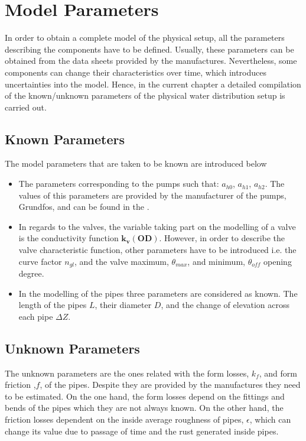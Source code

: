\section{Model Parameters}
\label{estimateParameters}
In order to obtain a complete model of the physical setup, all the parameters describing the components have to be defined. Usually, these parameters can be 
obtained from the data sheets provided by the manufactures. Nevertheless, some components can change their characteristics over time, which introduces uncertainties 
into the model. Hence, in the current chapter a detailed compilation of the known/unknown parameters of the physical water distribution setup is carried out.

\subsection{Known Parameters}

The model parameters that are taken to be known are introduced below


\begin{itemize}
  \item The parameters corresponding to the pumps such that: $a_{h0}$, $a_{h1}$, $a_{h2}$. The values of this parameters are provided by the 
  manufacturer of the pumps, Grundfos, and can be found in the \appref{}.
  
  \item In regards to the valves, the variable taking part on the modelling of a valve is the conductivity function $\pmb{k_v(OD)}$. However, in 
  order to describe the valve characteristic function, other parameters have to be introduced i.e. the curve factor $n_{gl}$, and the 
  valve maximum, $\theta_{max}$, and minimum, $\theta_{off}$ opening degree.
  
  \item In the modelling of the pipes three parameters are considered as known. The length of the pipes $L$, their diameter $D$, and the change of 
  elevation across each pipe $\Delta Z$.  
\end{itemize} 


\subsection{Unknown Parameters}
The unknown parameters are the ones related with the form losses, $k_f$, and form friction ,$f$, of the pipes. Despite they are 
provided by the manufactures they need to be estimated. On the one hand, the form losses depend on the fittings and bends of the pipes which they are not always known. 
On the other hand, the friction losses dependent on the inside average roughness of pipes, $\epsilon$, which can change its value due to passage of time 
and the rust generated inside pipes. 

